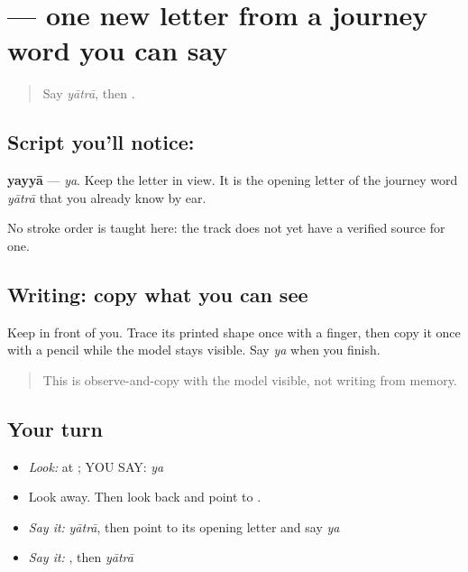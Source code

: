 \section[\texorpdfstring{\pa{ਯ} (ya)}{ਯ (ya)}]{ — one new letter from a journey word you can say}

\label{lesson:PA-C181-yayya}



\begin{quote}
Say \emph{yātrā}, then \textbf{  }.
\end{quote}

\subsection*{Script you'll notice: }
\begin{quote}
\end{quote}

\textbf{yayyā} — \emph{ya}. Keep the letter in view. It is the opening letter of the journey word \emph{yātrā} that you already know by ear.

No stroke order is taught here: the track does not yet have a verified source for one.

\subsection*{Writing: copy what you can see}
Keep \textbf{} in front of you. Trace its printed shape once with a finger, then copy it once with a pencil while the model stays visible. Say \emph{ya} when you finish.

\begin{quote}
This is observe-and-copy with the model visible, not writing from memory.
\end{quote}

\subsection*{Your turn}
\begin{itemize}
\raggedright
  \item \emph{Look:} at \textbf{}; YOU SAY: \emph{ya}
  \item Look away. Then look back and point to \textbf{}.
  \item \emph{Say it:} \emph{yātrā}, then point to its opening letter \textbf{} and say \emph{ya}
  \item \emph{Say it:} \textbf{  }, then \emph{yātrā}
\end{itemize}

